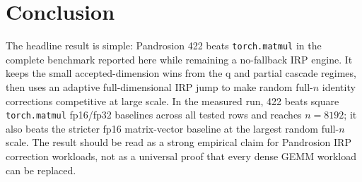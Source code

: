 \documentclass[11pt]{article}
\newcommand{\matmul}{\texttt{torch.matmul}}
\begin{document}
\section{Conclusion}

The headline result is simple: Pandrosion 422 beats \matmul{} in the complete
benchmark reported here while remaining a no-fallback IRP engine.  It keeps
the small accepted-dimension wins from the q and partial cascade regimes, then
uses an adaptive full-dimensional IRP jump to make random full-\(n\) identity
corrections competitive at large scale.  In the measured run, 422 beats square
\matmul{} fp16/fp32 baselines across all tested rows and reaches \(n=8192\);
it also beats the stricter fp16 matrix-vector baseline at the largest random
full-\(n\) scale.  The result should be read as a strong empirical claim for
Pandrosion IRP correction workloads, not as a universal proof that every dense
GEMM workload can be replaced.
\end{document}
